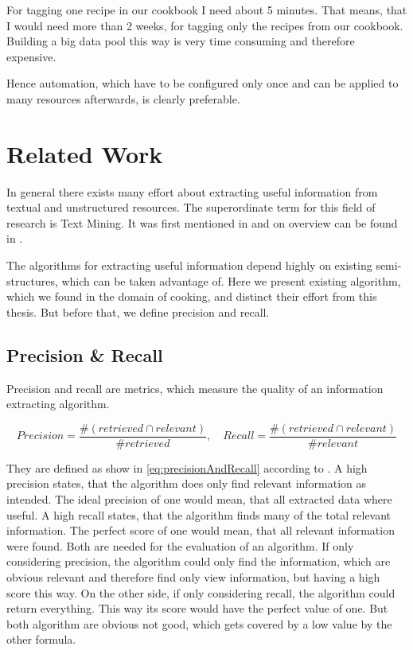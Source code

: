 \documentclass[12pt, twoside]{report}
\begin{document}
For tagging one recipe in our cookbook I need about 5 minutes. That means, that I would need more than 2 weeks, for tagging only the recipes from our cookbook. Building a big data pool this way is very time consuming and therefore expensive.

Hence automation, which have to be configured only once and can be applied to many resources afterwards, is clearly preferable.



\chapter{Related Work}
In general there exists many effort about extracting useful information from textual and unstructured resources. The superordinate term for this field of research is Text Mining. It was first mentioned in \parencite{KDT} and on overview can be found in \parencite{surveyOfTextMining}. 

The algorithms for extracting useful information depend highly on existing semi-structures, which can be taken advantage of. Here we present existing algorithm, which we found in the domain of cooking, and distinct their effort from this thesis. But before that, we define precision and recall.

\section{Precision \& Recall}
Precision and recall are metrics, which measure the quality of an information extracting algorithm.

\begin{equation} \label{eq:precisionAndRecall}
	Precision = \frac{\#(retrieved \cap relevant)}{\#retrieved}, \hspace{1em} Recall = \frac{\#(retrieved \cap relevant)}{\#relevant}
\end{equation}

They are defined as show in \cref{eq:precisionAndRecall} according to  \parencite{surveyOfTextMining}. A high precision states, that the algorithm does only find relevant information as intended. The ideal precision of one would mean, that all extracted data where useful. A high recall states, that the algorithm finds many of the total relevant information. The perfect score of one would mean, that all relevant information were found. Both are needed for the evaluation of an algorithm. If only considering precision, the algorithm could only find the information, which are obvious relevant and therefore find only view information, but having a high score this way. On the other side, if only considering recall, the algorithm could return everything. This way its score would have the perfect value of one. But both algorithm are obvious not good, which gets covered by a low value by the other formula.
\end{document}
